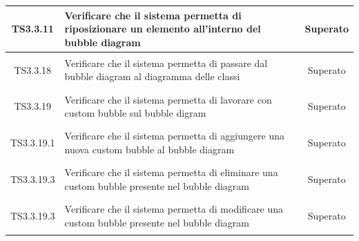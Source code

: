 \documentclass[../PianoDiQualifica.tex]{subfiles}
\begin{document}
\begin{longtable}{|c|>{\centering}p{10cm}|c|}
	\hline
	\hypertarget{TS3.3.11}{TS3.3.11} & Verificare che il sistema permetta di riposizionare un elemento all'interno del bubble diagram&Superato \\
	\hline
	\hypertarget{TS3.3.18}{TS3.3.18} & Verificare che il sistema permetta di passare dal bubble diagram al diagramma delle classi & Superato \\
	\hline
	\hypertarget{TS3.3.19}{TS3.3.19} & Verificare che il sistema permetta di lavorare con custom bubble sul bubble digram & Superato \\
	\hline
	\hypertarget{TS3.3.19.1}{TS3.3.19.1} & Verificare che il sistema permetta di aggiungere una nuova custom bubble al bubble diagram & Superato \\
	\hline
	\hypertarget{TS3.3.19.3}{TS3.3.19.3} & Verificare che il sistema permetta di eliminare una custom bubble presente nel bubble diagram &Superato \\
	\hline
	\hypertarget{TS3.3.19.3}{TS3.3.19.3} & Verificare che il sistema permetta di modificare una custom bubble presente nel bubble diagram &Superato \\

\end{longtable}
\end{document}
